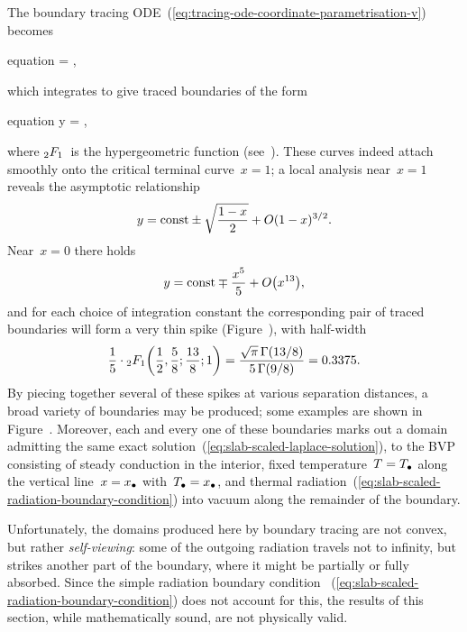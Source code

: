 The boundary tracing ODE~(\ref{eq:tracing-ode-coordinate-parametrisation-v})
becomes
\begin{important}{equation}
   = \mp {},
  \label{eq:slab-tracing-ode-coordinate-parametrisation-y}
\end{important}
which integrates to give traced boundaries of the form
\begin{important}{equation}
  y =
  \const
    \mp
    \cdot
  \hypergeo {},
  \label{eq:slab-traced-boundary}
\end{important}
where $\mathop{}\!{_2F_1}$~is the hypergeometric function
(see~\tbd).
These curves indeed attach smoothly
onto the critical terminal curve~$x = 1$;
a local analysis near~$x = 1$ reveals the asymptotic relationship
\begin{equation}
  y = \mathrm{const} \pm \sqrt{\frac{1 - x}{2}} + \mathop{}\! O (1 - x)^{3/2}.
  \label{eq:slab-traced-boundary-x-near-1}
\end{equation}
Near~$x = 0$ there holds
\begin{equation}
  y = \const \mp \frac{x^5}{5} + \order \roundbr*{x^{13}},
  \label{eq:slab-traced-boundary-x-near-0}
\end{equation}
and for each choice of integration constant
the corresponding pair of traced boundaries
will form a very thin spike (Figure~\tbd),
with half-width
\begin{equation}
  \frac{1}{5}
    \cdot
  \hypergeo \roundbr*{\frac{1}{2}, \frac{5}{8}; \frac{13}{8}; 1}
  = \frac{\sqrt{\pi} \gamm (13/8)}{5 \gamm (9/8)}
  = 0.3375.
  \label{eq:slab-traced-boundary-spike-half-width}
\end{equation}
By piecing together several of these spikes at various separation distances,
a broad variety of boundaries may be produced;
some examples are shown in Figure~\tbd.
Moreover, each and every one of these boundaries marks out a domain
admitting the same exact solution~(\ref{eq:slab-scaled-laplace-solution}),
to the BVP consisting of steady conduction in the interior,
fixed temperature~$T = T_\bullet$ along the vertical line~$x = x_\bullet$
with~$T_\bullet = x_\bullet$,
and thermal radiation~(\ref{eq:slab-scaled-radiation-boundary-condition})
into vacuum along the remainder of the boundary.

Unfortunately,
the domains produced here by boundary tracing are not convex,
but rather \emph{self-viewing}:
some of the outgoing radiation travels not to infinity,
but strikes another part of the boundary,
where it might be partially or fully absorbed.
Since the simple radiation boundary condition~%
  (\ref{eq:slab-scaled-radiation-boundary-condition})
does not account for this,
the results of this section,
while mathematically sound,
are not physically valid.

